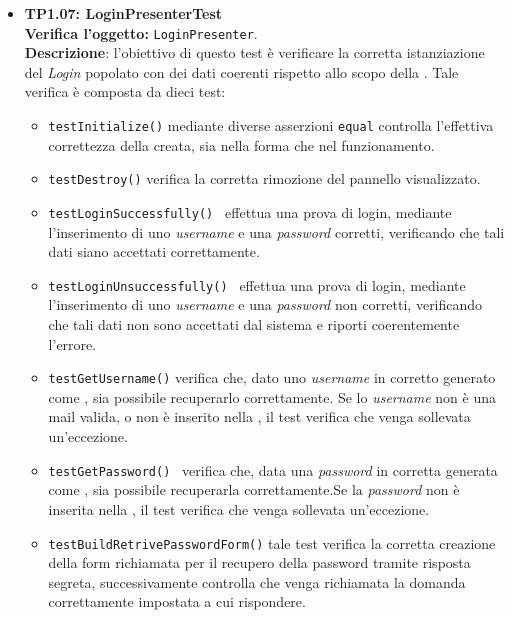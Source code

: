 \begin{itemize}
\item \textbf{TP1.07: LoginPresenterTest}\\
\textbf{Verifica l'oggetto:} \texttt{LoginPresenter}.\\
\textbf{Descrizione}: l'obiettivo di questo test è verificare la corretta istanziazione del \textit{Login} popolato con dei dati coerenti rispetto allo scopo della .
Tale verifica è composta da dieci test:
\begin{itemize} 

\item \texttt{testInitialize()} mediante diverse asserzioni \texttt{equal} controlla l'effettiva correttezza della  creata, sia nella forma che nel funzionamento.

\item \texttt{testDestroy()} verifica la corretta rimozione del pannello visualizzato.

\item \texttt{testLoginSuccessfully() } effettua una prova di login, mediante l'inserimento di uno \textit{username} e una \textit{password} corretti, verificando che tali dati siano accettati correttamente.

\item \texttt{testLoginUnsuccessfully() } effettua una prova di login, mediante l'inserimento di uno \textit{username} e una \textit{password} non corretti, verificando che tali dati non sono accettati dal sistema e riporti coerentemente l'errore.

\item \texttt{testGetUsername()} verifica che, dato uno \textit{username} in  corretto generato come , sia possibile recuperarlo correttamente. Se lo \textit{username} non è una mail valida, o non è inserito nella , il test verifica che venga sollevata un'eccezione.

\item \texttt{testGetPassword() } verifica che, data una \textit{password} in  corretta generata come , sia possibile recuperarla correttamente.Se la \textit{password} non è inserita nella , il test verifica che venga sollevata un'eccezione.

\item \texttt{testBuildRetrivePasswordForm()} tale test verifica la corretta creazione della form richiamata per il recupero della password tramite risposta segreta, successivamente controlla che venga richiamata la domanda correttamente impostata a cui rispondere.


\end{itemize}
\end{itemize}
